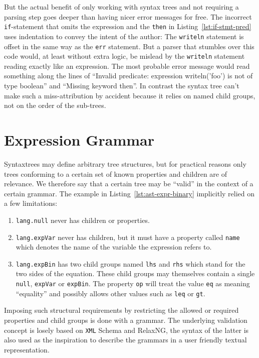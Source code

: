 \documentclass[sigconf,natbib=false,review=true,anonymous]{acmart}
\begin{document}
But the actual benefit of only working with syntax trees and not requiring a parsing step goes deeper than having nicer error messages for free. The incorrect \texttt{if}-statement that omits the expression and the \texttt{then} in Listing~\ref{lst:if-stmt-pred} uses indentation to convey the intent of the author: The \texttt{writeln} statement is offset in the same way as the \texttt{err} statement. But a parser that stumbles over this code would, at least without extra logic, be mislead by the \texttt{writeln} statement reading exactly like an expression. The most probable error message would read something along the lines of \enquote{Invalid predicate: expression writeln('foo') is not of type boolean} and \enquote{Missing keyword then}. In contrast the syntax tree can't make such a miss-attribution by accident because it relies on named child groups, not on the order of the sub-trees.

\section{Expression Grammar}
\label{sec:expression-grammar}

Syntaxtrees may define arbitrary tree structures, but for practical reasons only trees conforming to a certain set of known properties and children are of relevance. We therefore say that a certain tree may be \enquote{valid} in the context of a certain grammar. The example in Listing~\ref{lst:ast-expr-binary} implicitly relied on a few limitations:

\begin{enumerate}
\item \texttt{lang.null} never has children or properties.

\item \texttt{lang.expVar} never has children, but it must have a property called \texttt{name} which denotes the name of the variable the expression refers to.

\item \texttt{lang.expBin} has two child groups named \texttt{lhs} and \texttt{rhs} which stand for the two sides of the equation. These child groups may themselves contain a single \texttt{null}, \texttt{expVar} or \texttt{expBin}. The property \texttt{op} will treat the value \texttt{eq} as meaning \enquote{equality} and possibly allows other values such as \texttt{leq} or \texttt{gt}.
\end{enumerate}

Imposing such structural requirements by restricting the allowed or required properties and child groups is done with a grammar. The underlying validation concept is losely based on \texttt{XML} Schema and RelaxNG, the syntax of the latter is also used as the inspiration to describe the grammars in a user friendly textual representation.
\end{document}

